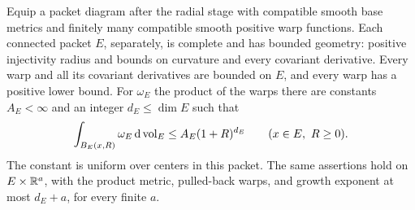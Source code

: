 \begin{lemma}\label{packet:geometry}
Equip a packet diagram after the radial stage with compatible smooth
base metrics and finitely many compatible smooth positive warp
functions.  Each connected packet $E$, separately, is complete and
has bounded geometry: positive injectivity radius and bounds on
curvature and every covariant derivative.  Every warp and all its
covariant derivatives are bounded on $E$, and every warp has a positive
lower bound.  For $\omega_E$ the product of the warps there are constants
$A_E<\infty$ and an integer $d_E\le\dim E$ such that
\begin{equation}\label{packet:growth}
 \int_{B_E(x,R)}\omega_E\,\mathrm d\operatorname{vol}_E
       \le A_E(1+R)^{d_E}
       \qquad(x\in E,\ R\ge0).
\end{equation}
The constant is uniform over centers in this packet.  The same assertions
hold on $E\times\mathbb R^a$, with the product metric, pulled-back warps,
and growth exponent at most $d_E+a$, for every finite $a$.
\end{lemma}

